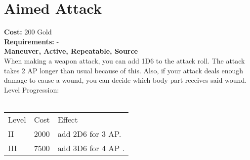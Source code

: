 \section{Aimed Attack}
\textbf{Cost:} 200 Gold\\
\textbf{Requirements:} -\\
\textbf{Maneuver, Active, Repeatable, Source}\\
When making a weapon attack, you can add 1D6 to the attack roll. The attack takes 2 AP longer than usual because of this. Also, if your attack deals enough damage to cause a wound, you can decide which body part receives said wound.
\\
Level Progression:\\
\\
\begin{tabular}{l | l | l}
	Level & Cost & Effect\\
	II & 2000 & add 2D6 for 3 AP.\\
	III & 7500 & add 3D6 for 4 AP .\\
\end{tabular}